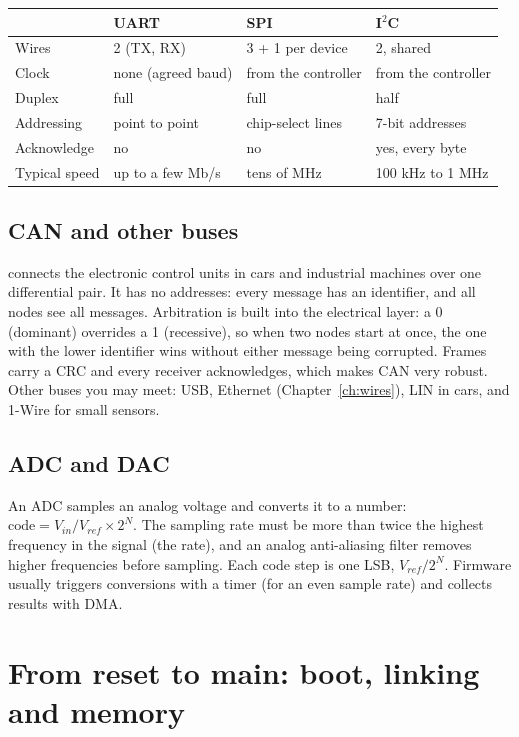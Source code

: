 \begin{center}
\begin{tabular}{llll}
\toprule
 & UART & SPI & I$^2$C \\
\midrule
Wires & 2 (TX, RX) & 3 + 1 per device & 2, shared \\
Clock & none (agreed baud) & from the controller & from the controller \\
Duplex & full & full & half \\
Addressing & point to point & chip-select lines & 7-bit addresses \\
Acknowledge & no & no & yes, every byte \\
Typical speed & up to a few Mb/s & tens of MHz & 100 kHz to 1 MHz \\
\bottomrule
\end{tabular}
\end{center}

\subsection*{CAN and other buses}

 connects the electronic control units in cars and industrial machines over one differential pair. It has no addresses: every message has an identifier, and all nodes see all messages. Arbitration is built into the electrical layer: a 0 (dominant) overrides a 1 (recessive), so when two nodes start at once, the one with the lower identifier wins without either message being corrupted. Frames carry a CRC and every receiver acknowledges, which makes CAN very robust. Other buses you may meet: USB, Ethernet (Chapter~\ref{ch:wires}), LIN in cars, and 1-Wire for small sensors.

\subsection*{ADC and DAC}

An ADC samples an analog voltage and converts it to a number: $\text{code} = V_{in}/V_{ref} \times 2^N$. The sampling rate must be more than twice the highest frequency in the signal (the  rate), and an analog anti-aliasing filter removes higher frequencies before sampling. Each code step is one LSB, $V_{ref}/2^N$. Firmware usually triggers conversions with a timer (for an even sample rate) and collects results with DMA.

\section{From reset to main: boot, linking and memory}

